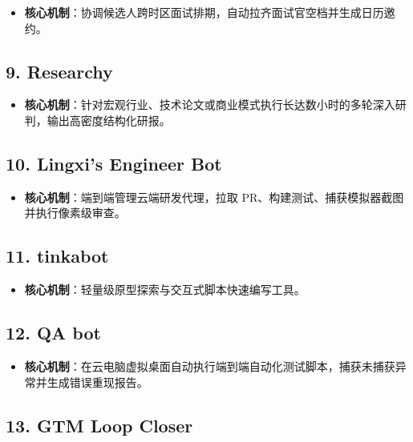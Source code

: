 \documentclass[10.5pt,a4paper,oneside]{report}
\providecommand{\tightlist}{\setlength{\itemsep}{0pt}\setlength{\parskip}{0pt}}
\begin{document}
\begin{itemize}
\tightlist
\item
  \textbf{核心机制}：协调候选人跨时区面试排期，自动拉齐面试官空档并生成日历邀约。
\end{itemize}

\subsection{9. Researchy}\label{researchy}

\begin{itemize}
\tightlist
\item
  \textbf{核心机制}：针对宏观行业、技术论文或商业模式执行长达数小时的多轮深入研判，输出高密度结构化研报。
\end{itemize}

\subsection{10. Lingxi's Engineer Bot}\label{lingxis-engineer-bot}

\begin{itemize}
\tightlist
\item
  \textbf{核心机制}：端到端管理云端研发代理，拉取
  PR、构建测试、捕获模拟器截图并执行像素级审查。
\end{itemize}

\subsection{11. tinkabot}\label{tinkabot}

\begin{itemize}
\tightlist
\item
  \textbf{核心机制}：轻量级原型探索与交互式脚本快速编写工具。
\end{itemize}

\subsection{12. QA bot}\label{qa-bot}

\begin{itemize}
\tightlist
\item
  \textbf{核心机制}：在云电脑虚拟桌面自动执行端到端自动化测试脚本，捕获未捕获异常并生成错误重现报告。
\end{itemize}

\subsection{13. GTM Loop Closer}\label{gtm-loop-closer}
\end{document}
